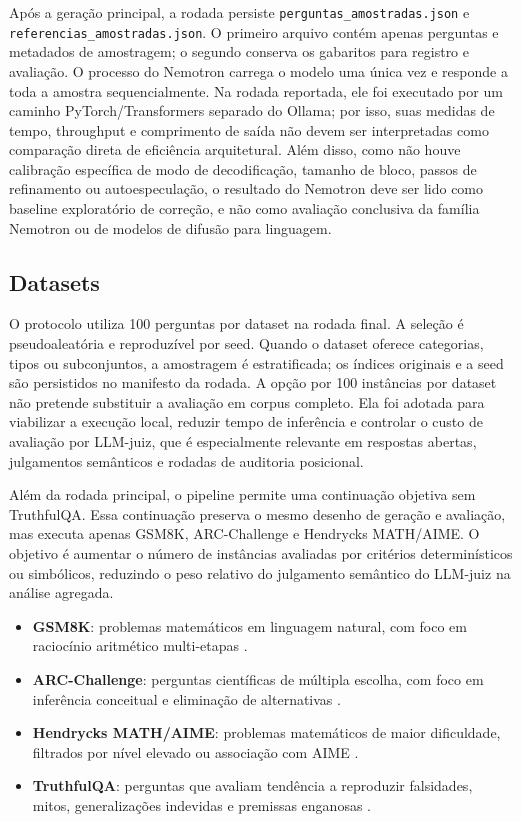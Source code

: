 \documentclass[12pt]{article}
\begin{document}
Ap\'os a gera\c{c}\~ao principal, a rodada persiste \texttt{perguntas\_amostradas.json} e \texttt{referencias\_amostradas.json}. O primeiro arquivo cont\'em apenas perguntas e metadados de amostragem; o segundo conserva os gabaritos para registro e avalia\c{c}\~ao. O processo do Nemotron carrega o modelo uma \'unica vez e responde a toda a amostra sequencialmente. Na rodada reportada, ele foi executado por um caminho PyTorch/Transformers separado do Ollama; por isso, suas medidas de tempo, throughput e comprimento de sa\'ida n\~ao devem ser interpretadas como compara\c{c}\~ao direta de efici\^encia arquitetural. Al\'em disso, como n\~ao houve calibra\c{c}\~ao espec\'ifica de modo de decodifica\c{c}\~ao, tamanho de bloco, passos de refinamento ou autoespecula\c{c}\~ao, o resultado do Nemotron deve ser lido como baseline explorat\'orio de corre\c{c}\~ao, e n\~ao como avalia\c{c}\~ao conclusiva da fam\'ilia Nemotron ou de modelos de difus\~ao para linguagem.

\subsection{Datasets}

O protocolo utiliza 100 perguntas por dataset na rodada final. A seleção é pseudoaleatória e reproduzível por seed. Quando o dataset oferece categorias, tipos ou subconjuntos, a amostragem é estratificada; os índices originais e a seed são persistidos no manifesto da rodada. A opção por 100 instâncias por dataset não pretende substituir a avaliação em corpus completo. Ela foi adotada para viabilizar a execução local, reduzir tempo de inferência e controlar o custo de avaliação por LLM-juiz, que é especialmente relevante em respostas abertas, julgamentos semânticos e rodadas de auditoria posicional.

Além da rodada principal, o pipeline permite uma continuação objetiva sem TruthfulQA. Essa continuação preserva o mesmo desenho de geração e avaliação, mas executa apenas GSM8K, ARC-Challenge e Hendrycks MATH/AIME. O objetivo é aumentar o número de instâncias avaliadas por critérios determinísticos ou simbólicos, reduzindo o peso relativo do julgamento semântico do LLM-juiz na análise agregada.

\begin{itemize}
\item \textbf{GSM8K}: problemas matemáticos em linguagem natural, com foco em raciocínio aritmético multi-etapas \cite{cobbe2021}.
\item \textbf{ARC-Challenge}: perguntas científicas de múltipla escolha, com foco em inferência conceitual e eliminação de alternativas \cite{clark2018}.
\item \textbf{Hendrycks MATH/AIME}: problemas matemáticos de maior dificuldade, filtrados por nível elevado ou associação com AIME \cite{hendrycks2021}.
\item \textbf{TruthfulQA}: perguntas que avaliam tendência a reproduzir falsidades, mitos, generalizações indevidas e premissas enganosas \cite{lin2022}.
\end{itemize}
\end{document}
